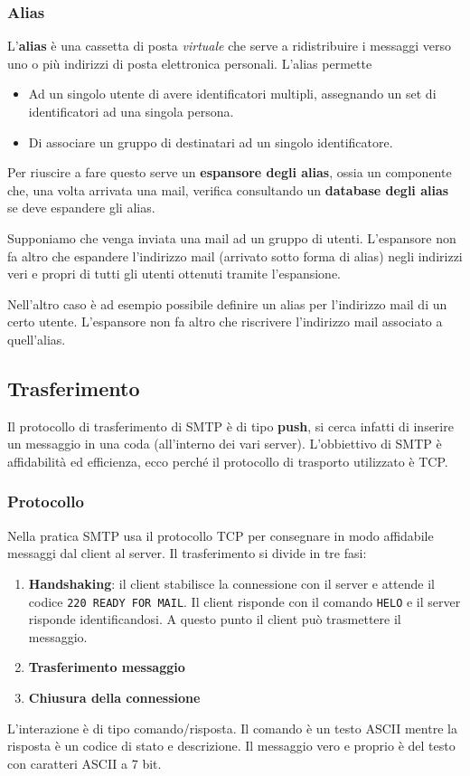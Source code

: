 \subsubsection{Alias}
L'\textbf{alias} è una cassetta di posta \emph{virtuale} che serve a 
ridistribuire i messaggi verso uno o più indirizzi di posta elettronica
personali. L'alias permette
\begin{itemize}
	\item Ad un singolo utente di avere identificatori multipli, 
		assegnando un set di identificatori ad una singola persona.
	\item Di associare un gruppo di destinatari ad un singolo 
		identificatore.
\end{itemize}
Per riuscire a fare questo serve un \textbf{espansore degli alias}, 
ossia un componente che, una volta arrivata una mail, verifica
consultando un \textbf{database degli alias} se deve espandere gli 
alias.

Supponiamo che venga inviata una mail ad un gruppo di utenti. 
L'espansore non fa altro che espandere l'indirizzo mail (arrivato sotto
forma di alias) negli indirizzi veri e propri di tutti gli utenti
ottenuti tramite l'espansione.

Nell'altro caso è ad esempio possibile definire un alias per 
l'indirizzo mail di un certo utente. L'espansore non fa altro che
riscrivere l'indirizzo mail associato a quell'alias.

\subsection{Trasferimento}
Il protocollo di trasferimento di SMTP è di tipo \textbf{push}, si 
cerca infatti di inserire un messaggio in una coda (all'interno dei 
vari server). L'obbiettivo di SMTP è affidabilità ed efficienza, ecco 
perché il protocollo di trasporto utilizzato è TCP.

\subsubsection{Protocollo}
Nella pratica SMTP usa il protocollo TCP per consegnare in modo 
affidabile messaggi dal client al server. Il trasferimento si divide in
tre fasi:
\begin{enumerate}
	\item \textbf{Handshaking}: il client stabilisce la connessione 
		con il server e attende il codice \verb|220 READY FOR MAIL|. Il
		client risponde con il comando \verb|HELO| e il server risponde
		identificandosi. A questo punto il client può trasmettere il 
		messaggio.
	\item \textbf{Trasferimento messaggio}
	\item \textbf{Chiusura della connessione}
\end{enumerate}
L'interazione è di tipo comando/risposta. Il comando è un testo ASCII 
mentre la risposta è un codice di stato e descrizione. Il messaggio
vero e proprio è del testo con caratteri ASCII a 7 bit.

